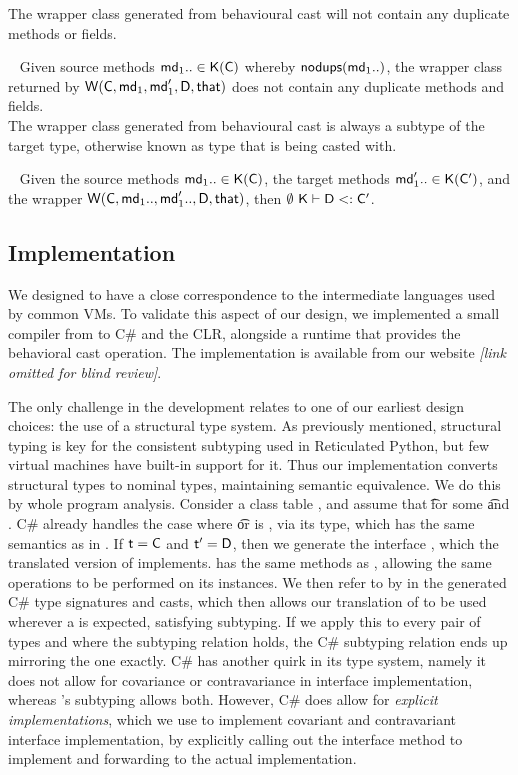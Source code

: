 \documentclass[acmlarge, anonymous, authordraft, review]{acmart} %
\begin{document}
\noindent
The wrapper class generated from behavioural cast will not contain
any duplicate methods or fields.

\medskip{} ~ Given source methods
$\md[1].. \In \App\K\C$ whereby $\cload{\md[1]..}$, the wrapper class
returned by $\wrapE{\C,\md[1], \mdp[1],\D,\that}$ does not contain any
duplicate methods and fields.\\

\noindent
The wrapper class generated from behavioural cast is always a subtype
of the target type, otherwise known as type that is being casted with.

\medskip{} ~ Given the source
methods $\md[1].. \In \App\K\C$, the target methods $\mdp[1].. \In
\App\K\Cp$, and the wrapper $\wrap\C{\md[1]..}{\mdp[1]..}\D\that $, then
$\StrSub\emptyset\K\D\Cp$.

\subsection{Implementation}

We designed \kafka to have a close correspondence to the intermediate
languages used by common VMs. To validate this aspect of our design, we
implemented a small compiler from \kafka to C\# and the CLR, alongside a
runtime that provides the behavioral cast operation. The implementation is
available from our website \emph{[link omitted for blind review]}.

The only challenge in the development relates to one of our earliest design
choices: the use of a structural type system. As previously mentioned,
structural typing is key for the consistent subtyping used in Reticulated
Python, but few virtual machines have built-in support for it. Thus our
implementation converts structural types to nominal types, maintaining
semantic equivalence.  We do this by whole program analysis. Consider a
class table \K, and assume that \StrSub{}\K\t\tp for some \t and \tp. C\#
already handles the case where \t or \tp is \any, via its  type,
which has the same semantics as \any in \kafka. If $\t=\C$ and $\tp=\D$,
then we generate the interface , which the translated version of \C
implements.  has the same methods as \D, allowing the same operations
to be performed on its instances. We then refer to \D by  in the
generated C\# type signatures and casts, which then allows our translation
of \C to be used wherever a \D is expected, satisfying subtyping. If we
apply this to every pair of types \C and \D where the subtyping relation
holds, the C\# subtyping relation ends up mirroring the \kafka one exactly.
C\# has another quirk in its type system, namely it does not allow for
covariance or contravariance in interface implementation, whereas \kafka's
subtyping allows both. However, C\# does allow for \emph{explicit
  implementations}, which we use to implement covariant and contravariant
interface implementation, by explicitly calling out the interface method to
implement and forwarding to the actual implementation.
\end{document}
